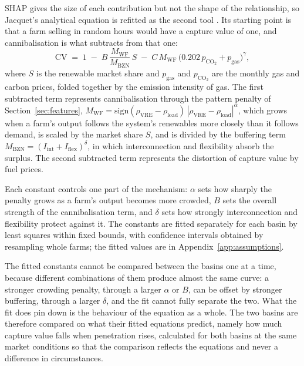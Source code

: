 SHAP gives the size of each contribution but not the shape of the relationship,
so Jacquet's analytical equation is refitted as the second tool
\cite{Jacquet2024}. Its starting point is that a farm selling in random hours
would have a capture value of one, and cannibalisation is what subtracts from
that one:
%
\begin{equation}
    \mathrm{CV} \;=\; 1
    \;-\; B\,\frac{M_{\mathrm{WF}}}{M_{\mathrm{BZN}}}\,S
    \;-\; C\,M_{\mathrm{WF}}\,
    \bigl(0.202\,p_{\mathrm{CO_2}} + p_{\mathrm{gas}}\bigr)^{\gamma},
    \label{eq:analytical}
\end{equation}
%
where $S$ is the renewable market share and $p_{\mathrm{gas}}$ and
$p_{\mathrm{CO_2}}$ are the monthly gas and carbon prices, folded together by
the emission intensity of gas. The first subtracted term represents cannibalisation through the pattern
penalty of Section~\ref{sec:features},
$M_{\mathrm{WF}} = \mathrm{sign}(\rho_{\mathrm{VRE}} -
\rho_{\mathrm{load}})\,|\rho_{\mathrm{VRE}} - \rho_{\mathrm{load}}|^{\alpha}$,
which grows when a farm's output follows the system's renewables more closely
than it follows demand, is scaled by the market share $S$, and is divided by
the buffering term
$M_{\mathrm{BZN}} = (I_{\mathrm{int}} + I_{\mathrm{flex}})^{\delta}$, in which
interconnection and flexibility absorb the surplus. The second subtracted term
represents the distortion of capture value by fuel prices.

Each constant controls one part of the mechanism: $\alpha$ sets how sharply the
penalty grows as a farm's output becomes more crowded, $B$ sets the overall
strength of the cannibalisation term, and $\delta$ sets how strongly
interconnection and flexibility protect against it. The constants are fitted
separately for each basin by least squares within fixed bounds, with confidence
intervals obtained by resampling whole farms; the fitted values are in
Appendix~\ref{app:assumptions}.

The fitted constants cannot be compared between the basins one at a time,
because different combinations of them produce almost the same curve: a
stronger crowding penalty, through a larger $\alpha$ or $B$, can be offset by
stronger buffering, through a larger $\delta$, and the fit cannot fully
separate the two. What the fit does pin down is the behaviour of the equation
as a whole. The two basins are therefore compared on what their fitted
equations predict, namely how much capture value falls when penetration rises,
calculated for both basins at the same market conditions so that the
comparison reflects the equations and never a difference in circumstances.

